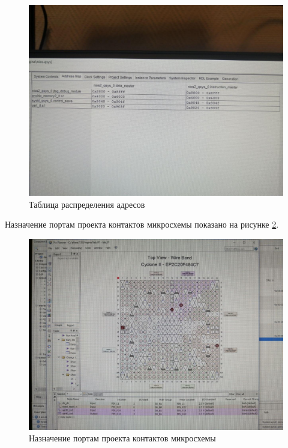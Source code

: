 \begin{figure}[H]
	\begin{center}
		\includegraphics[scale=0.9]{img/map.jpg}
	\end{center}
	\captionsetup{justification=centering}
	\caption{Таблица распределения адресов}
	\label{img:map}
\end{figure}

Назначение портам проекта контактов микросхемы показано на рисунке \ref{img:planner}.

\begin{figure}[H]
	\begin{center}
		\includegraphics[scale=0.9]{img/planner.jpg}
	\end{center}
	\captionsetup{justification=centering}
	\caption{Назначение портам проекта контактов микросхемы}
	\label{img:planner}
\end{figure}

